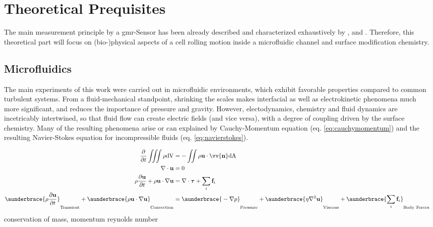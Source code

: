 \chapter{Theoretical Prequisites}
The main measurement principle by a \gls{gmr}-Sensor has been already described and characterized exhaustively by \citet{lit:thes:helou}, \citet{lit:thes:reisbeck} and \citet{lit:thes:brenner}. Therefore, this theoretical part will focus on (bio-)physical aspects of a cell rolling motion inside a microfluidic channel and surface modification chemistry.



\begin{figure}
\centering
{}
\label{}
\end{figure}
\begin{figure}
	\centering
	\label{}
\end{figure}
\begin{figure}
	\centering
	\label{}
\end{figure}
\begin{figure}
	\centering
	\label{}
\end{figure}

\section{Microfluidics}
The main experiments of this work were carried out in microfluidic environments, which exhibit favorable properties compared to common turbulent systems. From a fluid-mechanical standpoint, shrinking the scales makes interfacial as well as electrokinetic phenomena much more significant, and reduces the importance of pressure and gravity.\cite{lit:fluidic:kirby} However, electodynamics, chemistry and fluid dynamics are incetricably intertwined, so that fluid flow can create electric fields (and vice versa), with a degree of coupling driven by the surface chemistry. Many of the resulting phenomena arise or can explained by Cauchy-Momentum equation (eq. \ref{eq:cauchymomentum}) and the resulting Navier-Stokes equation for incompressible fluids (eq. \ref{eq:navierstokes}).

\begin{align}
	\frac{\partial}{\partial t} \iiint \rho \mathrm{dV} &= - \iint \rho \mathbf{u} \cdot \vv{\mathbf{n}} \mathrm{dA} \\
	\nabla \cdot \mathbf{u} &= 0 \\
		\rho \frac{\partial \mathbf{u}}{\partial t} + \rho\mathbf{u} \cdot \nabla \mathbf{u} &= \nabla \cdot \boldsymbol{\tau} + \sum_{i}\mathbf{f}_i \label{eq:cauchymomentum} \\	
	\aunderbrace{\vphantom{\sum_{i}} \rho \frac{\partial \mathbf{u}}{\partial t}}_{\mathrm{Transient}} + \aunderbrace{\vphantom{\sum_{i}}\rho\mathbf{u} \cdot \nabla \mathbf{u}}_{\mathrm{Convection}} &= \aunderbrace{\vphantom{\sum_{i}}-\nabla p}_{\mathrm{Pressure}} + \aunderbrace{\vphantom{\sum_{i}}\eta \nabla^2 \mathbf{u}}_{\mathrm{Viscous}} + \aunderbrace{\sum_{i}\mathbf{f}_i}_{\mathrm{Body \ Forces}} \label{eq:navierstokes}
\end{align}
conservation of mass, momentum
reynolds number
